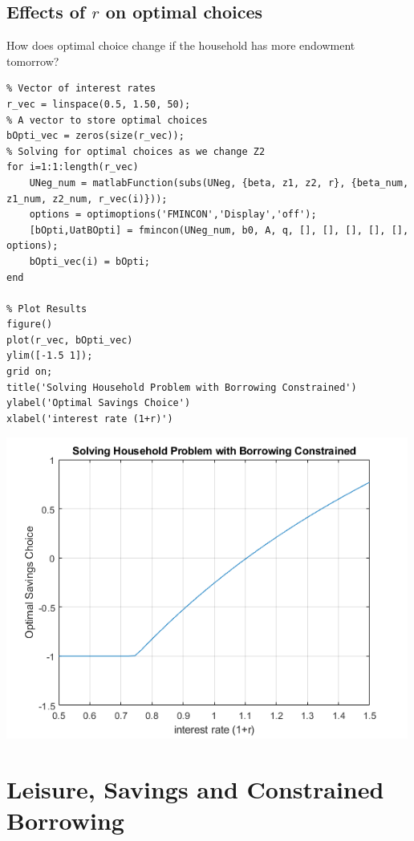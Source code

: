 \documentclass[
]{book}
\begin{document}
\hypertarget{effects-of-r-on-optimal-choices}{%
\subsection{\texorpdfstring{Effects of \(r\) on optimal choices}{Effects of r on optimal choices}}\label{effects-of-r-on-optimal-choices}}

How does optimal choice change if the household has more endowment
tomorrow?

\begin{verbatim}
% Vector of interest rates
r_vec = linspace(0.5, 1.50, 50);
% A vector to store optimal choices
bOpti_vec = zeros(size(r_vec));
% Solving for optimal choices as we change Z2
for i=1:1:length(r_vec)
    UNeg_num = matlabFunction(subs(UNeg, {beta, z1, z2, r}, {beta_num, z1_num, z2_num, r_vec(i)}));
    options = optimoptions('FMINCON','Display','off');
    [bOpti,UatBOpti] = fmincon(UNeg_num, b0, A, q, [], [], [], [], [], options);
    bOpti_vec(i) = bOpti;
end

% Plot Results
figure()
plot(r_vec, bOpti_vec)
ylim([-1.5 1]);
grid on;
title('Solving Household Problem with Borrowing Constrained')
ylabel('Optimal Savings Choice')
xlabel('interest rate (1+r)')
\end{verbatim}

\includegraphics[width=5.20833in,height=\textheight]{img/household_borrow_constrained_images/figure_1.png}

\hypertarget{leisure-savings-and-constrained-borrowing}{%
\section{Leisure, Savings and Constrained Borrowing}\label{leisure-savings-and-constrained-borrowing}}
\end{document}
